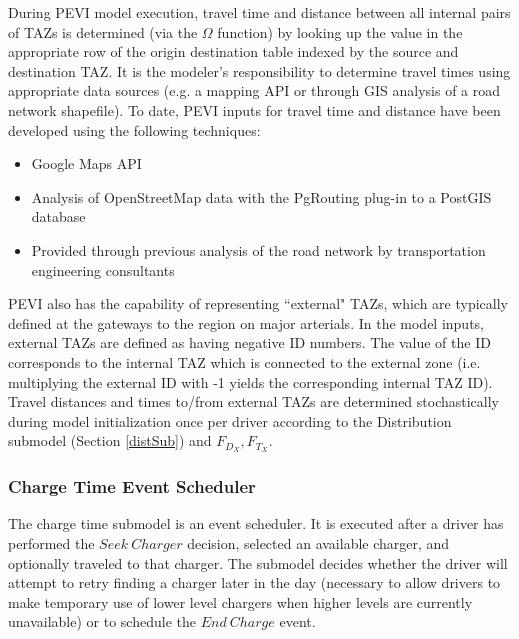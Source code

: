 \documentclass[journal]{IEEEtran}
\begin{document}
During PEVI model execution, travel time and distance between all internal pairs of TAZs is determined (via the $\Omega$ function) by looking up the value in the appropriate row of the origin destination table indexed by the source and destination TAZ.  It is the modeler's responsibility to determine travel times using appropriate data sources (e.g. a mapping API or through GIS analysis of a road network shapefile).  To date, PEVI inputs for travel time and distance have been developed using the following techniques:
\begin{itemize}
\item	Google Maps API
\item	Analysis of OpenStreetMap data with the PgRouting plug-in to a PostGIS database
\item	Provided through previous analysis of the road network by transportation engineering consultants
\end{itemize}
PEVI also has the capability of representing ``external" TAZs, which are typically defined at the gateways to the region on major arterials.  In the model inputs, external TAZs are defined as having negative ID numbers.  The value of the ID corresponds to the internal TAZ which is connected to the external zone (i.e. multiplying the external ID with -1 yields the corresponding internal TAZ ID).
Travel distances and times to/from external TAZs are determined stochastically during model initialization once per driver according to the Distribution submodel (Section \ref{distSub}) and $F_{D_X}, F_{T_X}$. 

\subsubsection{Charge Time Event Scheduler}\label{chargeSched}

The charge time submodel is an event scheduler.  It is executed after a driver has performed the $Seek ~Charger$ decision, selected an available charger, and optionally traveled to that charger.  The submodel decides whether the driver will attempt to retry finding a charger later in the day (necessary to allow drivers to make temporary use of lower level chargers when higher levels are currently unavailable) or to schedule the $End ~Charge$ event.
\end{document}
